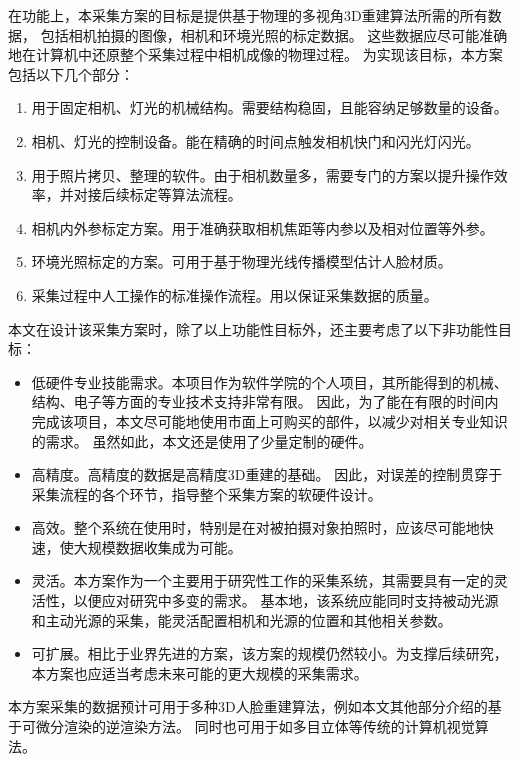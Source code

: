 在功能上，本采集方案的目标是提供基于物理的多视角3D重建算法所需的所有数据，
包括相机拍摄的图像，相机和环境光照的标定数据。
这些数据应尽可能准确地在计算机中还原整个采集过程中相机成像的物理过程。
为实现该目标，本方案包括以下几个部分：
\begin{enumerate}
\item 用于固定相机、灯光的机械结构。需要结构稳固，且能容纳足够数量的设备。
\item 相机、灯光的控制设备。能在精确的时间点触发相机快门和闪光灯闪光。
\item 用于照片拷贝、整理的软件。由于相机数量多，需要专门的方案以提升操作效率，并对接后续标定等算法流程。
\item 相机内外参标定方案。用于准确获取相机焦距等内参以及相对位置等外参。
\item 环境光照标定的方案。可用于基于物理光线传播模型估计人脸材质。
\item 采集过程中人工操作的标准操作流程。用以保证采集数据的质量。
\end{enumerate}
本文在设计该采集方案时，除了以上功能性目标外，还主要考虑了以下非功能性目标：
\begin{itemize}
\item 低硬件专业技能需求。本项目作为软件学院的个人项目，其所能得到的机械、结构、电子等方面的专业技术支持非常有限。
因此，为了能在有限的时间内完成该项目，本文尽可能地使用市面上可购买的部件，以减少对相关专业知识的需求。
虽然如此，本文还是使用了少量定制的硬件。

\item 高精度。高精度的数据是高精度3D重建的基础。
因此，对误差的控制贯穿于采集流程的各个环节，指导整个采集方案的软硬件设计。

\item 高效。整个系统在使用时，特别是在对被拍摄对象拍照时，应该尽可能地快速，使大规模数据收集成为可能。

\item 灵活。本方案作为一个主要用于研究性工作的采集系统，其需要具有一定的灵活性，以便应对研究中多变的需求。
基本地，该系统应能同时支持被动光源和主动光源的采集，能灵活配置相机和光源的位置和其他相关参数。

\item 可扩展。相比于业界先进的方案，该方案的规模仍然较小。为支撑后续研究，本方案也应适当考虑未来可能的更大规模的采集需求。

\end{itemize}

本方案采集的数据预计可用于多种3D人脸重建算法，例如本文其他部分介绍的基于可微分渲染的逆渲染方法。
同时也可用于如多目立体等传统的计算机视觉算法。


